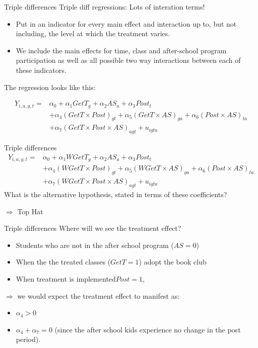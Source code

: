 \documentclass[
  ignorenonframetext,
]{beamer}
\begin{document}
\begin{frame}{Triple differences}
\protect\hypertarget{triple-differences}{}
Triple diff regressions: Lots of interation terms!

\begin{itemize}
\item
  Put in an indicator for every main effect and interaction up to, but
  not including, the level at which the treatment varies.
\item
  We include the main effects for time, class and after-school program
  participation as well as all possible two way interactions between
  each of these indicators.
\end{itemize}

The regression looks like this:

\[
\begin{aligned}
Y_{i,a,g,t}=&\alpha_0+\alpha_1 GetT_{g}+\alpha_2 AS_{a}+\alpha_3 Post_{t}\\
&+\alpha_4 (GetT \times Post)_{gt}+\alpha_5 (GetT \times AS)_{ga}+\alpha_6 (Post \times AS)_{ta}\\
&+\alpha_7 (GetT \times Post \times AS)_{agt}+u_{igta}
\end{aligned}
\]
\end{frame}

\begin{frame}{Triple differences}
\protect\hypertarget{triple-differences-1}{}
\[
\begin{aligned}
Y_{i,a,g,t}=&\alpha_0+\alpha_1 WGetT_{g}+\alpha_2 AS_{a}+\alpha_3 Post_{t}\\
&+\alpha_4 (WGetT \times Post)_{gt}+\alpha_5 (WGetT \times AS)_{ga}+\alpha_6 (Post \times AS)_{ta}\\
&+\alpha_7 (WGetT \times Post \times AS)_{agt}+u_{igta}
\end{aligned}
\] What is the alternative hypothesis, stated in terms of these
coefficients?

\(\Rightarrow\) Top Hat
\end{frame}

\begin{frame}{Triple differences}
\protect\hypertarget{triple-differences-2}{}
Where will we see the treatment effect?

\begin{itemize}
\item
  Students who are not in the after school program (\(AS=0\))
\item
  When the the treated classes (\(GetT=1\)) adopt the book club
\item
  When treatment is implemented\(Post=1\),
\end{itemize}

\(\Rightarrow\) we would expect the treatment effect to manifest as:

\begin{itemize}
\item
  \(\alpha_4>0\)
\item
  \(\alpha_4+\alpha_7=0\) (since the after school kids experience no
  change in the post period).
\end{itemize}
\end{frame}
\end{document}

